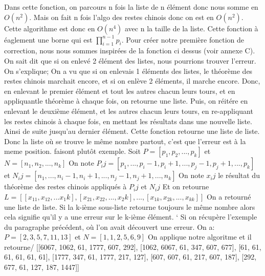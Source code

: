 \documentclass[a4paper, 11pt]{report}
\begin{document}
Dans cette fonction, on parcours n fois la liste de n élément donc nous somme en $O(n^2)$. Mais on fait n fois l'algo des restes chinois donc on est en $O(n^2)$. Cette algorithme est donc en $O(n^4)$ avec n la taille de la liste.
Cette fonction à éaglement une borne qui est $ \prod_{i=1}^{n-1} p_i $.
\newline 
\newline
Pour créer notre première fonction de correction, nous nous sommes inspirées de la fonction ci dessus (voir annexe C). On sait dit que si on enlevé 2 élément des listes, nous pourrions trouver l'erreur. On s'explique;
On a vu que si on enlevais 1 éléments des listes, le théorème des restes chinois marchait encore, et si on enlève 2 éléments, il marche encore. Donc, en enlevant le premier élément et tout les autres chacun leurs
tours, et en appliquantle théorème à chaque fois, on retourne une liste. Puis, on réitére en enlevant le deuxième élément, et les autres chacun leurs tours, en re-appliquant les restes chinois à chaque fois, en mettant les résultats dans
une nouvelle liste. Ainsi de suite jusqu'au dernier élément. Cette fonction retourne une liste de liste. Donc la liste où se trouve le même nombre partout, c'est que l'erreur est à la meme position.
faisont plutôt exemple.
\newline 
Soit $P=[p_1, p_2, ... , p_k]$ et $N=[n_1 , n_2, ... ,n_k]$ \newline
On note $P_ij =[p_1 , ... , p_i-1 , p_i+1 , ... , p_j-1 , p_j+1 , ... , p_k]$ et $N_ij=[n_1, ..., n_i-1, n_i+1, ..., n_j-1, n_j+1, ..., n_k]$ \newline
On note $x_ij$ le résultat du théorème des restes chinois appliqués à $P_ij$ et $N_ij$ \newline
Et on retourne $L=[[x_11,x_12,...x_1k],[x_21,x_22,...,x_2k],...,[x_{1k},x_{2k},...,x_{kk}]]$ \newline
On a retourné une liste de liste. Si la k-ième sous-liste retourne toujours le même nombre alors cela signifie qu'il y a une erreur sur le k-ième élément. \newline`
\newline
Si on récupère l'exemple du paragraphe précédent, où l'on avait découvert une erreur. \newline
On a: $P=[2,3,5,7,11,13]$ et $N=[1,1,2,5,6,9]$ \newline
On applique notre algoritme et il retourne/
[[6067, 1062, 61, 1777, 607, 292], [1062, 6067, 61, 347, 607, 677], [61, 61, 61, 61, 61, 61], [1777, 347, 61, 1777, 217, 127], [607, 607, 61, 217, 607, 187], [292, 677, 61, 127, 187, 1447]] \newline
\end{document}
